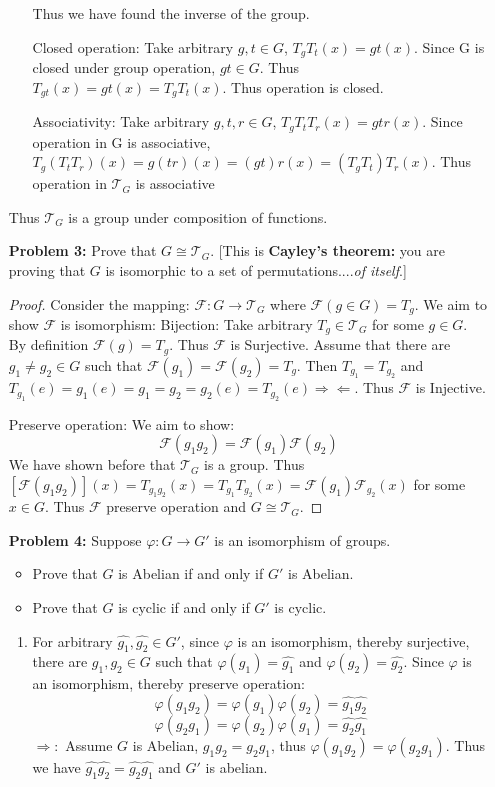 \documentclass[11pt, oneside]{article}
\begin{document}
\begin{enumerate}
\begin{enumerate}
    Thus we have found the inverse of the group.
    \item[Closed operation: ] Take arbitrary $g, t\in G$, $T_gT_t(x)= gt(x)$. Since G is closed under group operation, $gt\in G$. Thus $T_{gt}(x)=gt(x)=T_gT_t(x)$. Thus operation is closed.
    \item[Associativity: ] Take arbitrary $g, t, r\in G$, $T_gT_tT_r(x)=gtr(x)$. Since operation in G is associative, $T_g(T_tT_r)(x)=g(tr)(x)=(gt)r(x)=(T_gT_t)T_r(x)$. Thus operation in $\mathcal{T}_G$ is associative
\end{enumerate}
Thus $\mathcal{T}_G$ is a group under composition of functions.
\newpage
\item[{\bf Problem 3:}] Prove that $G\cong \mathcal T_G$. [This is {\bf Cayley's theorem:} you are proving that $G$ is isomorphic to a set of permutations....{\it of itself}.]
\begin{proof}
Consider the mapping: $\mathcal{F}: G \rightarrow \mathcal{T}_G$ where $\mathcal{F}(g\in G)=T_g$. We aim to show $\mathcal{F}$ is isomorphism: 
\newline
Bijection: Take arbitrary $T_g\in \mathcal{T}_G$ for some $g\in G$. By definition $\mathcal{F}(g)=T_g$. Thus $\mathcal{F}$ is Surjective.  Assume that there are $g_1\neq g_2\in G $ such that $\mathcal{F}(g_1)=\mathcal{F}(g_2)=T_g$. Then $T_{g_1}=T_{g_2}$ and $T_{g_1}(e)=g_1(e)=g_1=g_2=g_2(e)=T_{g_2}(e) \Rightarrow\Leftarrow$. Thus $\mathcal{F}$ is Injective.

\newline
Preserve operation: We aim to show:
\[\mathcal{F}(g_1g_2)=\mathcal{F}(g_1)\mathcal{F}(g_2)\]
We have shown before that $\mathcal{T}_G$ is a group. Thus $[\mathcal{F}(g_1g_2)](x)=T_{g_1g_2}(x)=T_{g_1}T_{g_2}(x)=\mathcal{F}(g_1)\mathcal{F}_{g_2}(x)$ for some $x\in G$. Thus $\mathcal{F}$ preserve operation and $G\cong \mathcal T_G$. 
\end{proof}




\newpage 
\item[{\bf Problem 4:}] Suppose $\varphi:G\rightarrow G'$ is an isomorphism of groups. 
\begin{itemize}
\item Prove that $G$ is Abelian if and only if $G'$ is Abelian.
\item Prove that $G$ is cyclic if and only if $G'$ is cyclic.
\end{itemize}

\begin{enumerate}
    \item  For arbitrary $\hat{g_1}, \hat{g_2}\in G'$, since $\varphi$ is an isomorphism, thereby surjective, there are $g_1, g_2 \in G$ such that $\varphi (g_1)=\hat{g_1}$ and $\varphi (g_2)=\hat{g_2}$. Since $\varphi$ is an isomorphism, thereby preserve operation:
    \[\varphi(g_1g_2)=\varphi(g_1)\varphi(g_2)=\hat{g_1}\hat{g_2}\]
    \[\varphi(g_2g_1)=\varphi(g_2)\varphi(g_1)=\hat{g_2}\hat{g_1}\]
    $\Rightarrow:$ Assume $G$ is Abelian, $g_1g_2=g_2g_1$, thus $\varphi(g_1g_2)=\varphi(g_2g_1)$. 
    \newline
    Thus we have $\hat{g_1}\hat{g_2}=\hat{g_2}\hat{g_1}$ and $G'$ is abelian.
    

\end{enumerate}
\end{enumerate}
\end{document}
